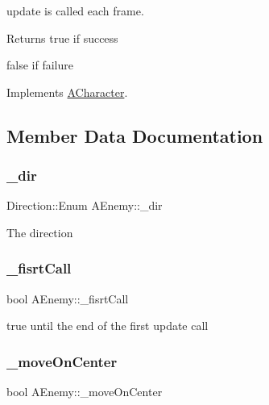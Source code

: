 update is called each frame. 

\begin{DoxyReturn}{Returns}
true if success 

false if failure 
\end{DoxyReturn}


Implements \hyperlink{class_a_character_af5a4d00f6104d45b821a2e88b80936b5}{A\+Character}.



\subsection{Member Data Documentation}
\mbox{\label{class_a_enemy_af85a958024c72d9c0f522be466c75092}} 
\subsubsection{\texorpdfstring{\+\_\+dir}{\_dir}}
{\footnotesize\ttfamily Direction\+::\+Enum A\+Enemy\+::\+\_\+dir\hspace{0.3cm}{\ttfamily [protected]}}

The direction \mbox{\label{class_a_enemy_a112cb8a927706e1a563119258239f4b6}} 
\subsubsection{\texorpdfstring{\+\_\+fisrt\+Call}{\_fisrtCall}}
{\footnotesize\ttfamily bool A\+Enemy\+::\+\_\+fisrt\+Call\hspace{0.3cm}{\ttfamily [protected]}}

true until the end of the first update call \mbox{\label{class_a_enemy_af05841272b0bfa864dcfffaeb1e29a9b}} 
\subsubsection{\texorpdfstring{\+\_\+move\+On\+Center}{\_moveOnCenter}}
{\footnotesize\ttfamily bool A\+Enemy\+::\+\_\+move\+On\+Center\hspace{0.3cm}{\ttfamily [protected]}}

